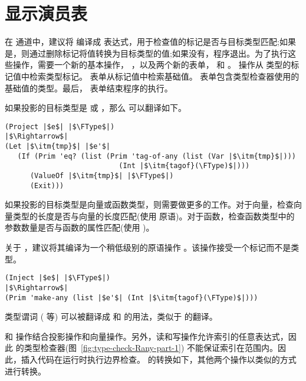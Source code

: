 \documentclass[11pt]{book}
\begin{document}
\section{显示演员表}
\label{sec:reveal-casts-Rany}


在  通道中，建议将 
编译成  表达式，用于检查值的标记是否与目标类型匹配;如果是，则通过删除标记将值转换为目标类型的值;如果没有，程序退出。为了执行这些操作，需要一个新的基本操作，
 ，以及两个新的表单，  和  。
  操作从  类型的标记值中检索类型标记。  表单从标记值中检索基础值。  表单包含类型检查器使用的基础值的类型。最后，  表单结束程序的执行。

如果投影的目标类型是  或
 ，那么  可以翻译如下。
\begin{center}
\begin{minipage}{1.0\textwidth}
\begin{lstlisting}
(Project |$e$| |$\FType$|)
|$\Rightarrow$|
(Let |$\itm{tmp}$| |$e'$|
   (If (Prim 'eq? (list (Prim 'tag-of-any (list (Var |$\itm{tmp}$|)))
                           (Int |$\itm{tagof}(\FType)$|)))
      (ValueOf |$\itm{tmp}$| |$\FType$|)
      (Exit)))
\end{lstlisting}
\end{minipage}
\end{center}
如果投影的目标类型是向量或函数类型，则需要做更多的工作。对于向量，检查向量类型的长度是否与向量的长度匹配(使用
 原语)。对于函数，检查函数类型中的参数数量是否与函数的属性匹配(使用
)。

关于  ，建议将其编译为一个稍低级别的原语操作  。该操作接受一个标记而不是类型。
\begin{center}
\begin{minipage}{1.0\textwidth}
\begin{lstlisting}
(Inject |$e$| |$\FType$|)
|$\Rightarrow$|
(Prim 'make-any (list |$e'$| (Int |$\itm{tagof}(\FType)$|)))
\end{lstlisting}
\end{minipage}
\end{center}

类型谓词 ( 等) 可以被翻译成  和  的用法，类似于  的翻译。

  和  操作结合投影操作和向量操作。另外，读和写操作允许索引的任意表达式，因此 \LangAny{} 的类型检查器(图~\ref{fig:type-check-Rany-part-1})
不能保证索引在范围内。因此，插入代码在运行时执行边界检查。
 的转换如下，其他两个操作以类似的方式进行转换。
\end{document}
